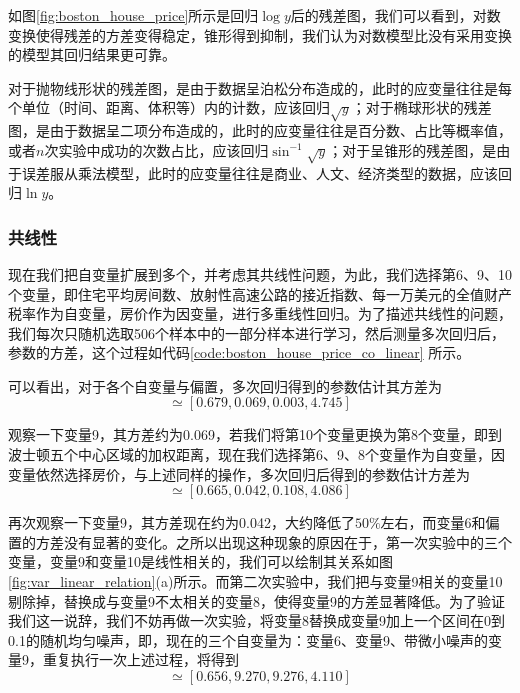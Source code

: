 

如图\ref{fig:boston_house_price}所示是回归$\log y$后的残差图，我们可以看到，对数变换使得残差的方差变得稳定，锥形得到抑制，我们认为对数模型比没有采用变换的模型其回归结果更可靠。

对于抛物线形状的残差图，是由于数据呈泊松分布造成的，此时的应变量往往是每个单位（时间、距离、体积等）内的计数，应该回归$\sqrt{y}$；对于椭球形状的残差图，是由于数据呈二项分布造成的，此时的应变量往往是百分数、占比等概率值，或者$n$次实验中成功的次数占比，应该回归$\sin^{-1}\sqrt{y}$；对于呈锥形的残差图，是由于误差服从乘法模型，此时的应变量往往是商业、人文、经济类型的数据，应该回归$\ln y$。



\subsubsection{共线性} %
\label{ssub:共线性}
现在我们把自变量扩展到多个，并考虑其共线性问题，为此，我们选择第6、9、10个变量，即住宅平均房间数、放射性⾼速公路的接近指数、每⼀万美元的全值财产税率作为自变量，房价作为因变量，进行多重线性回归。为了描述共线性的问题，我们每次只随机选取506个样本中的一部分样本进行学习，然后测量多次回归后，参数的方差，这个过程如代码\ref{code:boston_house_price_co_linear} 所示。


可以看出，对于各个自变量与偏置，多次回归得到的参数估计其方差为
\begin{equation}
	[\sigma_6,\sigma_9,\sigma_{10},\sigma_b] \simeq [0.679,0.069,0.003,4.745]
\end{equation}

观察一下变量9，其方差约为0.069，若我们将第10个变量更换为第8个变量，即到波⼠顿五个中⼼区域的加权距离，现在我们选择第6、9、8个变量作为自变量，因变量依然选择房价，与上述同样的操作，多次回归后得到的参数估计方差为
\begin{equation}
	[\sigma_6,\sigma_9,\sigma_8,\sigma_b] \simeq [ 0.665,0.042,0.108,4.086]
\end{equation}



再次观察一下变量9，其方差现在约为0.042，大约降低了$50\%$左右，而变量6和偏置的方差没有显著的变化。之所以出现这种现象的原因在于，第一次实验中的三个变量，变量9和变量10是线性相关的，我们可以绘制其关系如图\ref{fig:var_linear_relation}(a)所示。而第二次实验中，我们把与变量9相关的变量10剔除掉，替换成与变量9不太相关的变量8，使得变量9的方差显著降低。为了验证我们这一说辞，我们不妨再做一次实验，将变量8替换成变量9加上一个区间在0到0.1的随机均匀噪声，即，现在的三个自变量为：变量6、变量9、带微小噪声的变量9，重复执行一次上述过程，将得到
\begin{equation}
	[\sigma_6,\sigma_9,\sigma_{9^*},\sigma_b] \simeq [ 0.656, 9.270, 9.276, 4.110]
\end{equation}

